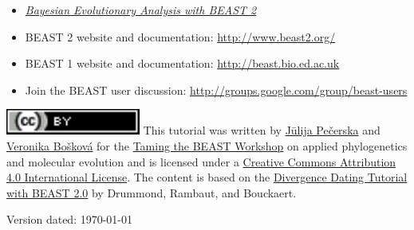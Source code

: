 \documentclass[11pt]{article}
\begin{document}
\begin{itemize}
\item \href{http://www.beast2.org/book.html}{\textit{Bayesian Evolutionary Analysis with BEAST 2}} \\ \vspace{-7mm}
\item BEAST 2 website and documentation: \href{http://www.beast2.org/}{http://www.beast2.org/} \\ \vspace{-7mm}
\item BEAST 1 website and documentation: \href{http://beast.bio.ed.ac.uk}{http://beast.bio.ed.ac.uk} \\ \vspace{-7mm}
\item Join the BEAST user discussion: \href{http://groups.google.com/group/beast-users}{http://groups.google.com/group/beast-users} \\ \vspace{-7mm}
\end{itemize}

\href{http://creativecommons.org/licenses/by/4.0/}{\includegraphics[scale=0.8]{figures/ccby.pdf}} This tutorial was written by \href{https://www.bsse.ethz.ch/cevo/the-group/people/person-detail.html?persid=192596}{J\={u}lija Pe\v{c}erska} and \href{https://www.bsse.ethz.ch/cevo/the-group/people/person-detail.html?persid=184671}{Veronika Bo\v{s}kov\'{a}} for the \href{https://www.bsse.ethz.ch/cevo/taming-the-beast.html}{Taming the BEAST Workshop} on applied phylogenetics and molecular evolution and is licensed under a \href{http://creativecommons.org/licenses/by/4.0/}{Creative Commons Attribution 4.0 International License}. The content is based on the \href{https://github.com/CompEvol/beast2/blob/master/doc/tutorials/DivergenceDating/DivergenceDatingTutorialv2.0.3.pdf?raw=true}{Divergence Dating Tutorial with BEAST 2.0} by Drummond, Rambaut, and Bouckaert.



Version dated: \today


\newpage


\printbibliography[heading=relevref]
\end{document}
